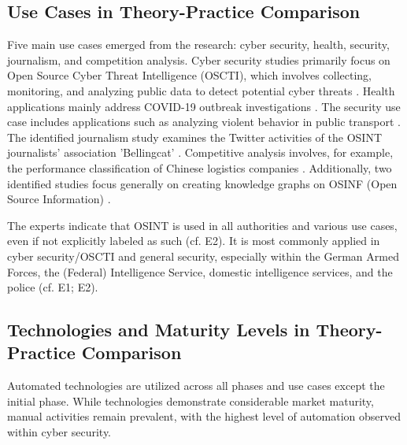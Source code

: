 \documentclass[10pt]{article}
\begin{document}
\subsection{Use Cases in Theory-Practice Comparison}

Five main use cases emerged from the research: cyber security, health, security, journalism,
and competition analysis. Cyber security studies primarily focus on Open Source Cyber Threat
Intelligence (OSCTI), which involves collecting, monitoring, and analyzing public
data to detect potential cyber threats \cite{Ahuja.2022}.
Health applications mainly address COVID-19 outbreak investigations \cite{Kpozehouen.2020}.
The security use case includes applications such as
analyzing violent behavior in public transport \cite{Nobili.2021}. The identified journalism study examines the
Twitter activities of the OSINT journalists' association 'Bellingcat' \cite{Bar.2023}. Competitive analysis
involves, for example, the performance classification of Chinese logistics companies \cite{Tao.2023}.
Additionally, two identified studies focus generally on creating knowledge graphs on OSINF (Open Source Information) \cite{Hu.2023, Ma.2022}.

The experts indicate that OSINT is used in all authorities and various use cases, even if not explicitly labeled as such (cf. E2). It is most commonly applied in cyber security/OSCTI and general security, especially within the German Armed Forces, the (Federal) Intelligence Service, domestic intelligence services, and the police (cf. E1; E2).

\subsection{Technologies and Maturity Levels in Theory-Practice Comparison} \label{sec:matcomp}

Automated technologies are utilized across all phases and use cases except the initial phase.
While technologies demonstrate considerable market maturity, manual activities remain prevalent, with the highest level of automation observed within cyber security.
\end{document}
